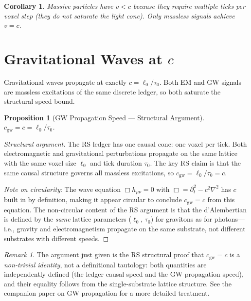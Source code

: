 \documentclass[12pt,a4paper]{article}
\newtheorem{corollary}[theorem]{Corollary}
\newtheorem{proposition}[theorem]{Proposition}
\theoremstyle{definition}
\theoremstyle{remark}
\newtheorem{remark}[theorem]{Remark}
\begin{document}
\begin{corollary}
Massive particles have $v < c$ because they require multiple ticks per
voxel step (they do not saturate the light cone).  Only massless
signals achieve $v = c$.
\end{corollary}

\section{Gravitational Waves at $c$}

Gravitational waves propagate at exactly $c = \ell_0/\tau_0$.  Both
EM and GW signals are massless excitations of the same discrete
ledger, so both saturate the structural speed bound.

\begin{proposition}[GW Propagation Speed --- Structural Argument]
$c_{\mathrm{gw}} = c = \ell_0/\tau_0$.
\end{proposition}

\begin{proof}[Structural argument]
The RS ledger has one causal cone: one voxel per tick.  Both
electromagnetic and gravitational perturbations propagate on the same
lattice with the same voxel size $\ell_0$ and tick duration $\tau_0$.
The key RS claim is that the same causal structure governs all massless
excitations, so $c_{\mathrm{gw}} = \ell_0/\tau_0 = c$.

\emph{Note on circularity}: The wave equation $\Box h_{\mu\nu} = 0$
with $\Box = \partial_t^2 - c^2\nabla^2$ has $c$ built in by definition,
making it appear circular to conclude $c_{\mathrm{gw}} = c$ from this
equation.  The non-circular content of the RS argument is that the
d'Alembertian is defined by the \emph{same} lattice parameters
($\ell_0$, $\tau_0$) for gravitons as for photons---i.e., gravity
and electromagnetism propagate on the same substrate, not different
substrates with different speeds.
\end{proof}

\begin{remark}
The argument just given is the RS structural proof that $c_{\mathrm{gw}} = c$
is a \emph{non-trivial identity}, not a definitional tautology: both
quantities are independently defined (the ledger causal speed and the
GW propagation speed), and their equality follows from the single-substrate
lattice structure.  See the companion paper on GW propagation for a
more detailed treatment.
\end{remark}
\end{document}

